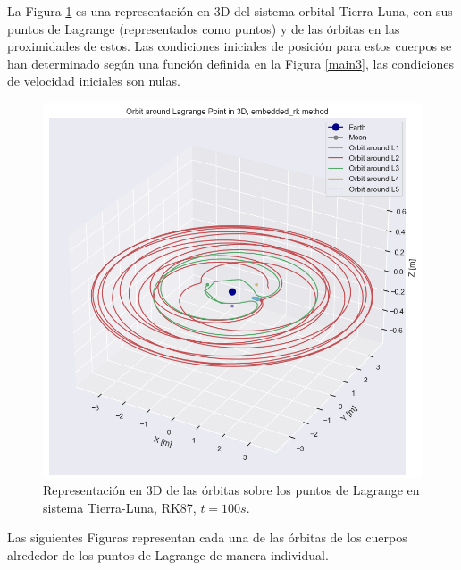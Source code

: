 \documentclass[12pt,a4paper]{article}
\begin{document}
La Figura \ref{Lptos_orbit_erk_t100} es una representación en 3D del sistema orbital Tierra-Luna, con sus puntos de Lagrange (representados como puntos) y de las órbitas en las proximidades de estos. Las condiciones iniciales de posición para estos cuerpos se han determinado según una función definida en la Figura \ref{main3}, las condiciones de velocidad iniciales son nulas.
\begin{figure}[H]
	\centering
	\includegraphics[width=\textwidth]{FIGURES/mil6/Lptos_orbit_erk_t100.png}
	\caption{Representación en 3D de las órbitas sobre los puntos de Lagrange en sistema Tierra-Luna, RK87, $t = 100 s$.}
	\label{Lptos_orbit_erk_t100}
\end{figure}

Las siguientes Figuras representan cada una de las órbitas de los cuerpos alrededor de los puntos de Lagrange de manera individual.

\newcommand\x{0.65}
\end{document}

